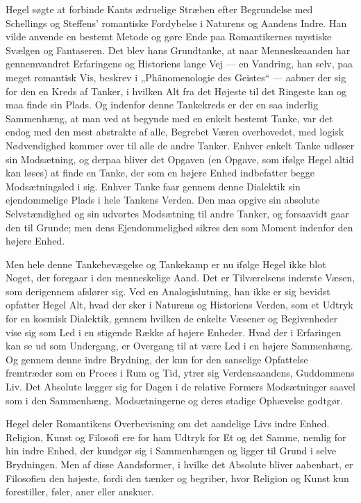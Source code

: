 \documentclass[12pt,a4paper,openany]{book}
\newcommand{\opage}[1]{\marginnote{\footnotesize\textit{[#1]}}}
\begin{document}
Hegel søgte at forbinde Kants ædruelige Stræben efter Begrundelse med
Schellings og Steffens' romantiske Fordybelse i Naturens og Aandens Indre. Han
vilde anvende en bestemt Metode og gøre Ende paa Romantikernes mystiske Svælgen
og Fantaseren. Det blev hans Grundtanke, at naar Menneskeaanden har
gennemvandret Erfaringens og Historiens lange Vej --- en Vandring, han selv,
paa meget romantisk Vis, beskrev i „Phänomenologie des Geistes“ --- aabner der
sig for den en Kreds af Tanker, i hvilken Alt fra det Højeste til det Ringeste
kan og maa finde sin Plads. Og indenfor denne Tankekreds er der en saa inderlig
Sammenhæng, at man ved at begynde med en enkelt bestemt Tanke, var det endog
med den mest abstrakte af alle, Begrebet Væren overhovedet, med logisk
Nødvendighed kommer over til alle de andre Tanker. Enhver enkelt Tanke udløser
sin Modsætning, og derpaa bliver det Opgaven (en Opgave, som ifølge Hegel altid
kan løses) at finde en Tanke, der som en højere Enhed indbefatter begge
Modsætningsled i sig. Enhver Tanke faar gennem denne Dialektik sin
ejendommelige Plads i hele Tankens Verden. Den maa opgive sin absolute
Selvstændighed og sin udvortes Modsætning til andre Tanker, og forsaavidt gaar
den til Grunde; men dens Ejendommelighed sikres den som Moment indenfor den
højere Enhed.

Men hele denne Tankebevægelse og Tankekamp er nu
\setcounter{footnote}{0}%
\opage{129}ifølge Hegel ikke blot Noget, der foregaar i den menneskelige Aand.
Det er Tilværelsens inderste Væsen, som derigennem afslører sig. Ved en
Analogislutning, han ikke er sig bevidst opfatter Hegel Alt, hvad der sker i
Naturens og Historiens Verden, som et Udtryk for en kosmisk Dialektik, gennem
hvilken de enkelte Væsener og Begivenheder vise sig som Led i en stigende Række
af højere Enheder. Hvad der i Erfaringen kan se ud som Undergang, er Overgang
til at være Led i en højere Sammenhæng. Og gennem denne indre Brydning, der kun
for den sanselige Opfattelse fremtræder som en Proces i Rum og Tid, ytrer sig
Verdensaandens, Guddommens Liv. Det Absolute lægger sig for Dagen i de relative
Formers Modsætninger saavel som i den Sammenhæng, Modsætningerne og deres
stadige Ophævelse godtgør.

Hegel deler Romantikens Overbevisning om det aandelige Livs indre Enhed.
Religion, Kunst og Filosofi ere for ham Udtryk for Et og det Samme, nemlig for
hin indre Enhed, der kundgør sig i Sammenhængen og ligger til Grund i selve
Brydningen. Men af disse Aandsformer, i hvilke det Absolute bliver aabenbart,
er Filosofien den højeste, fordi den tænker og begriber, hvor Religion og Kunst
kun forestiller, føler, aner eller anskuer.
\end{document}
